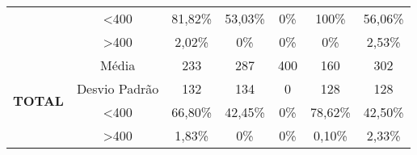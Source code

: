 \begin{table}[H]
\begin{tabular}{|c|c|ccccc|}
                                & \textless 400    & 81,82\%           & 53,03\%           & 0\%            & 100\%          & 56,06\%           \\
                                & \textgreater 400 & 2,02\%            & 0\%            & 0\%            & 0\%            & 2,53\%            \\ \hline
\multirow{4}{*}{\textbf{TOTAL}} & Média            & 233               & 287               & 400               & 160               & 302               \\
                                & Desvio Padrão    & 132               & 134               & 0                 & 128               & 128               \\
                                & \textless 400    & 66,80\%           & 42,45\%           & 0\%            & 78,62\%           & 42,50\%           \\
                                & \textgreater 400 & 1,83\%            & 0\%            & 0\%            & 0,10\%            & 2,33\%            \\ \hline
\end{tabular}
\end{table}
